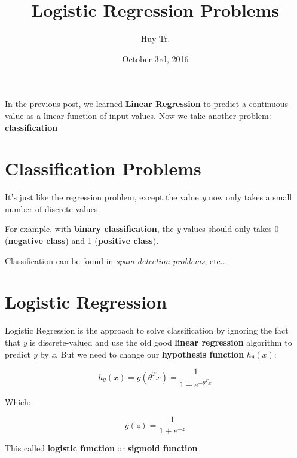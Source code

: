\documentclass{article}
\title{Logistic Regression Problems}
\author{Huy Tr.}
\date{October 3rd, 2016}
\begin{document}
\maketitle

In the previous post, we learned \textbf{Linear Regression} to predict a continuous value as a linear function of input values. Now we take another problem: \textbf{classification}

\section{Classification Problems}

\begin{flushleft}
It's just like the regression problem, except the value \textit{y} now only takes a small number of discrete values.
\end{flushleft}
\begin{flushleft}
For example, with \textbf{binary classification}, the \textit{y} values should only takes 0 (\textbf{negative class}) and 1 (\textbf{positive class}).
\end{flushleft}
\begin{flushleft}
Classification can be found in \textit{spam detection problems}, etc...
\end{flushleft}

\section{Logistic Regression}

\begin{flushleft}
Logistic Regression is the approach to solve classification by ignoring the fact that \textit{y} is discrete-valued and use the old good \textbf{linear regression} algorithm to predict \textit{y} by \textit{x}. But we need to change our \textbf{hypothesis function} $h_{\theta}(x)$:
\end{flushleft}

\begin{equation}
    h_{\theta}(x)=g(\theta^{T}x)=\frac{1}{1 + e^{-\theta^{T}x}}
\end{equation}

Which: 

\begin{equation}
    g(z)=\frac{1}{1 + e^{-z}}
\end{equation}

\begin{flushleft}
This called \textbf{logistic function} or \textbf{sigmoid function}
\end{flushleft}
\end{document}
